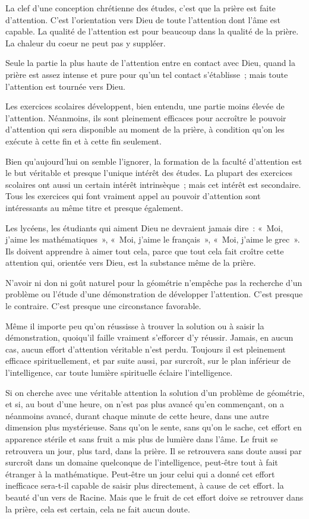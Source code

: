 \documentclass[french,twoside]{book} %
\newcommand\chaptercont{} %
\begin{document}
\chaptercont
\noindent La clef d'une conception chrétienne des études, c'est que la prière est faite d'attention. C'est l'orientation vers Dieu de toute l'attention dont l'âme est capable. La qualité de l'attention est pour beaucoup dans la qualité de la prière. La chaleur du coeur ne peut pas y suppléer.\par
Seule la partie la plus haute de l'attention entre en contact avec Dieu, quand la prière est assez intense et pure pour qu'un tel contact s'établisse ; mais toute l'attention est tournée vers Dieu.\par
Les exercices scolaires développent, bien entendu, une partie moins élevée de l'attention. Néanmoins, ils sont pleinement efficaces pour accroître le pouvoir d'attention qui sera disponible au moment de la prière, à condition qu'on les exécute à cette fin et à cette fin seulement.\par
Bien qu'aujourd'hui on semble l'ignorer, la formation de la faculté d'attention est le but véritable et presque l'unique intérêt des études. La plupart des exercices scolaires ont aussi un certain intérêt intrinsèque ; mais cet intérêt est secondaire. Tous les exercices qui font vraiment appel au pouvoir d'attention sont intéressants au même titre et presque également.\par
Les lycéens, les étudiants qui aiment Dieu ne devraient jamais dire : « Moi, j'aime les mathématiques », « Moi, j'aime le français », « Moi, j'aime le grec ». Ils doivent apprendre à aimer tout cela, parce que tout cela fait croître cette attention qui, orientée vers Dieu, est la substance même de la prière.\par
N'avoir ni don ni goût naturel pour la géométrie n'empêche pas la recherche d'un problème ou l'étude d'une démonstration de développer l'attention. C'est presque le contraire. C'est presque une circonstance favorable.\par
Même il importe peu qu'on réussisse à trouver la solution ou à saisir la démonstration, quoiqu'il faille vraiment s'efforcer d'y réussir. Jamais, en aucun cas, aucun effort d'attention véritable n'est perdu. Toujours il est pleinement efficace spirituellement, et par suite aussi, par surcroît, sur le plan inférieur de l'intelligence, car toute lumière spirituelle éclaire l'intelligence.\par
Si on cherche avec une véritable attention la solution d'un problème de géométrie, et si, au bout d'une heure, on n'est pas plus avancé qu'en commençant, on a néanmoins avancé, durant chaque minute de cette heure, dans une autre dimension plus mystérieuse. Sans qu'on le sente, sans qu'on le sache, cet effort en apparence stérile et sans fruit a mis plus de lumière dans l'âme. Le fruit se retrouvera un jour, plus tard, dans la prière. Il se retrouvera sans doute aussi par surcroît dans un domaine quelconque de l'intelligence, peut-être tout à fait étranger à la mathématique. Peut-être un jour celui qui a donné cet effort inefficace sera-t-il capable de saisir plus directement, à cause de cet effort. la beauté d'un vers de Racine. Mais que le fruit de cet effort doive se retrouver dans la prière, cela est certain, cela ne fait aucun doute.\par
\end{document}
